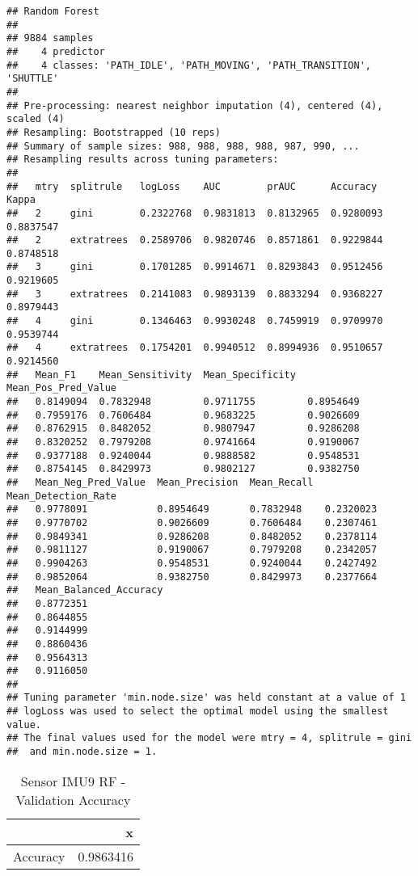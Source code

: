 \documentclass[]{article}
\begin{document}
\begin{verbatim}
## Random Forest 
## 
## 9884 samples
##    4 predictor
##    4 classes: 'PATH_IDLE', 'PATH_MOVING', 'PATH_TRANSITION', 'SHUTTLE' 
## 
## Pre-processing: nearest neighbor imputation (4), centered (4), scaled (4) 
## Resampling: Bootstrapped (10 reps) 
## Summary of sample sizes: 988, 988, 988, 988, 987, 990, ... 
## Resampling results across tuning parameters:
## 
##   mtry  splitrule   logLoss    AUC        prAUC      Accuracy   Kappa    
##   2     gini        0.2322768  0.9831813  0.8132965  0.9280093  0.8837547
##   2     extratrees  0.2589706  0.9820746  0.8571861  0.9229844  0.8748518
##   3     gini        0.1701285  0.9914671  0.8293843  0.9512456  0.9219605
##   3     extratrees  0.2141083  0.9893139  0.8833294  0.9368227  0.8979443
##   4     gini        0.1346463  0.9930248  0.7459919  0.9709970  0.9539744
##   4     extratrees  0.1754201  0.9940512  0.8994936  0.9510657  0.9214560
##   Mean_F1    Mean_Sensitivity  Mean_Specificity  Mean_Pos_Pred_Value
##   0.8149094  0.7832948         0.9711755         0.8954649          
##   0.7959176  0.7606484         0.9683225         0.9026609          
##   0.8762915  0.8482052         0.9807947         0.9286208          
##   0.8320252  0.7979208         0.9741664         0.9190067          
##   0.9377188  0.9240044         0.9888582         0.9548531          
##   0.8754145  0.8429973         0.9802127         0.9382750          
##   Mean_Neg_Pred_Value  Mean_Precision  Mean_Recall  Mean_Detection_Rate
##   0.9778091            0.8954649       0.7832948    0.2320023          
##   0.9770702            0.9026609       0.7606484    0.2307461          
##   0.9849341            0.9286208       0.8482052    0.2378114          
##   0.9811127            0.9190067       0.7979208    0.2342057          
##   0.9904263            0.9548531       0.9240044    0.2427492          
##   0.9852064            0.9382750       0.8429973    0.2377664          
##   Mean_Balanced_Accuracy
##   0.8772351             
##   0.8644855             
##   0.9144999             
##   0.8860436             
##   0.9564313             
##   0.9116050             
## 
## Tuning parameter 'min.node.size' was held constant at a value of 1
## logLoss was used to select the optimal model using the smallest value.
## The final values used for the model were mtry = 4, splitrule = gini
##  and min.node.size = 1.
\end{verbatim}

\begin{table}[!h]

\caption{\label{tab:sensor-rf-results}Sensor IMU9 RF - Validation Accuracy}
\centering
\begin{tabular}[t]{lr}
\toprule
  & x\\
\midrule
Accuracy & 0.9863416\\
\bottomrule
\end{tabular}
\end{table}
\end{document}
